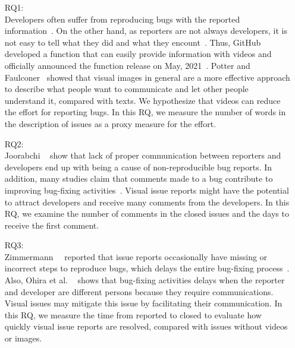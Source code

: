 \begin{itemize}
	\item[RQ1:] \textbf{\RQone{}}\\
	Developers often suffer from reproducing bugs with the reported information~\citep{DBLP:conf/sigsoft/ChaparroLZMPMBN17}\citep{DBLP:conf/icsm/0001KC20}\citep{zimmermann2010TSE}. 
	On the other hand, as reporters are not always developers, it is not easy to tell what they did and what they encount~\citep{DBLP:conf/sigsoft/ChaparroBLMMPPN19}. Thus, GitHub developed a function that can easily provide information with videos and officially announced the function release on May, 2021~\citep{github-video-blog}. Potter and Faulconer~\citep{POTTER1975} showed that visual images in general are a more effective approach to describe what people want to communicate and let other people understand it, compared with texts. We hypothesize that videos can reduce the effort for reporting bugs. In this RQ, we measure the number of words in the description of issues as a proxy measure for the effort. 
	\item[RQ2:] \textbf{\RQtwo{}}\\
	Joorabchi \et~\citep{DBLP:conf/msr/JoorabchiMM14} show that lack of proper communication between reporters and developers end up with being a cause of non-reproducible bug reports. In addition, many studies claim that comments made to a bug contribute to improving bug-fixing activities~\citep{DBLP:conf/icse/GigerPG10}\citep{DBLP:conf/msr/Panjer07}\citep{zhang2012WCRE}.  Visual issue reports might have the potential to attract developers and receive many comments from the developers. In this RQ, we examine the number of comments in the closed issues and the days to receive the first comment.
	\item[RQ3:] \textbf{\RQthree{}}\\
	Zimmermann~\et~\citep{zimmermann2010TSE} reported that issue reports occasionally have missing or incorrect steps to reproduce bugs, which delays the entire bug-fixing process~\citep{github-video-blog}. Also, Ohira et al. ~\citep{DBLP:conf/icsm/OhiraHOM12} shows that bug-fixing activities delays when the reporter and developer are different persons because they require communications. Visual issues may mitigate this issue by facilitating their communication. In this RQ, we measure the time from reported to closed to evaluate how quickly visual issue reports are resolved, compared with issues without videos or images. 
\end{itemize}

